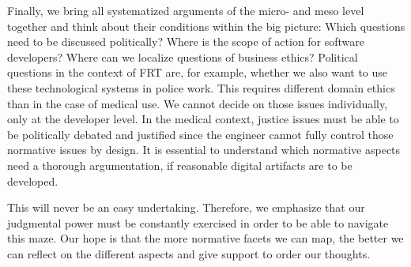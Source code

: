 \documentclass[manuscript,screen]{acmart}
\begin{document}
Finally, we bring all systematized arguments of the micro- and meso level together and think about their conditions within the big picture: Which questions need to be discussed politically? Where is the scope of action for software developers? Where can we localize questions of business ethics? Political questions in the context of FRT are, for example, whether we also want to use these technological systems in police work. This requires different domain ethics than in the case of medical use. We cannot decide on those issues individually, only at the developer level. In the medical context, justice issues must be able to be politically debated and justified since the engineer cannot fully control those normative issues by design. It is essential to understand which normative aspects need a thorough argumentation, if reasonable digital artifacts are to be developed.

This will never be an easy undertaking. Therefore, we emphasize that our judgmental power must be constantly exercised in order to be able to navigate this maze. Our hope is that the more normative facets we can map, the better we can reflect on the different aspects and give support to order our thoughts.








\end{document}
